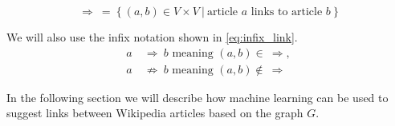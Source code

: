 \begin{equation}
\label{eq:binary_relation}
\Rightarrow\ =\ \{\ (a,b) \in V \times V\ |\ \text{article } a \text{ links to article } b\ \}
\end{equation}

We will also use the infix notation shown in \cref{eq:infix_link}.
\begin{equation}
\label{eq:infix_link}
  \begin{split}
    a\ & \Rightarrow\ b \text{ meaning } (a,b) \in\ \Rightarrow,\\
    a\ & \not\Rightarrow\ b \text{ meaning } (a,b) \not\in\ \Rightarrow
  \end{split}
\end{equation}

In the following section we will describe how machine learning can be used to suggest links between Wikipedia articles based on the graph $G$.

